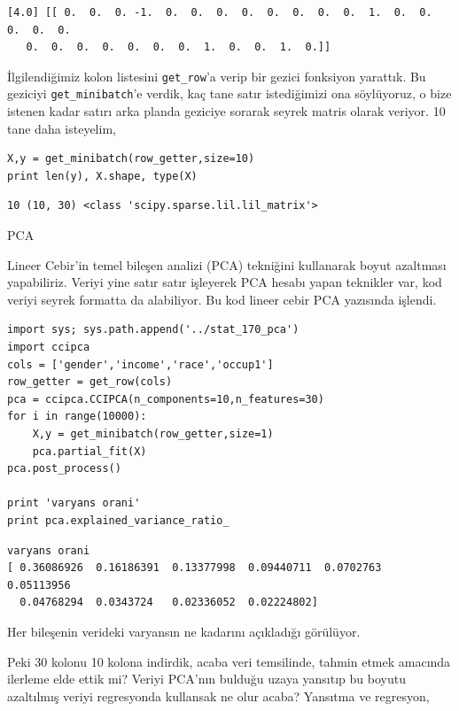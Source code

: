 \documentclass[12pt,fleqn]{article}\usepackage{../../common}
\begin{document}
\begin{verbatim}
[4.0] [[ 0.  0.  0. -1.  0.  0.  0.  0.  0.  0.  0.  0.  1.  0.  0.  0.  0.  0.
   0.  0.  0.  0.  0.  0.  0.  1.  0.  0.  1.  0.]]
\end{verbatim}

İlgilendiğimiz kolon listesini \verb!get_row!'a verip bir gezici fonksiyon
yarattık. Bu geziciyi \verb!get_minibatch!'e verdik, kaç tane satır
istediğimizi ona söylüyoruz, o bize istenen kadar satırı arka planda
geziciye sorarak seyrek matris olarak veriyor. 10 tane daha isteyelim,

\begin{verbatim}
X,y = get_minibatch(row_getter,size=10)
print len(y), X.shape, type(X)
\end{verbatim}

\begin{verbatim}
10 (10, 30) <class 'scipy.sparse.lil.lil_matrix'>
\end{verbatim}

PCA

Lineer Cebir'in temel bileşen analizi (PCA) tekniğini kullanarak boyut
azaltması yapabiliriz. Veriyi yine satır satır işleyerek PCA hesabı yapan
teknikler var, kod veriyi seyrek formatta da alabiliyor. Bu kod lineer
cebir PCA yazısında işlendi. 

\begin{verbatim}
import sys; sys.path.append('../stat_170_pca')
import ccipca
cols = ['gender','income','race','occup1']
row_getter = get_row(cols)
pca = ccipca.CCIPCA(n_components=10,n_features=30)
for i in range(10000): 
    X,y = get_minibatch(row_getter,size=1)
    pca.partial_fit(X)
pca.post_process()

print 'varyans orani'
print pca.explained_variance_ratio_
\end{verbatim}

\begin{verbatim}
varyans orani
[ 0.36086926  0.16186391  0.13377998  0.09440711  0.0702763   0.05113956
  0.04768294  0.0343724   0.02336052  0.02224802]
\end{verbatim}

Her bileşenin verideki varyansın ne kadarını açıkladığı görülüyor. 

Peki 30 kolonu 10 kolona indirdik, acaba veri temsilinde, tahmin etmek
amacında ilerleme elde ettik mi?  Veriyi PCA'nın bulduğu uzaya yansıtıp bu
boyutu azaltılmış veriyi regresyonda kullansak ne olur acaba? Yansıtma ve
regresyon,
\end{document}
